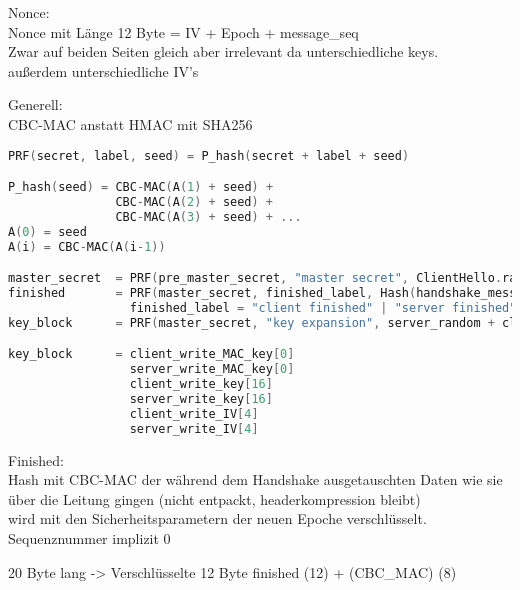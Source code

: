 Nonce:\\
Nonce mit Länge 12 Byte = IV + Epoch + message\_seq\\
Zwar auf beiden Seiten gleich aber irrelevant da unterschiedliche keys.\\
außerdem unterschiedliche IV's

Generell:\\
CBC-MAC anstatt HMAC mit SHA256
\begin{lstlisting}[language=c]
PRF(secret, label, seed) = P_hash(secret + label + seed)

P_hash(seed) = CBC-MAC(A(1) + seed) +
               CBC-MAC(A(2) + seed) +
               CBC-MAC(A(3) + seed) + ...
A(0) = seed
A(i) = CBC-MAC(A(i-1))

master_secret  = PRF(pre_master_secret, "master secret", ClientHello.random + ServerHello.random)[0..47]; (105 | 153) = (36 | 84) + 13 + 28 + 28
finished       = PRF(master_secret, finished_label, Hash(handshake_messages))[0..verify_data_length-1];            79 = 48 + 15 + 16
                 finished_label = "client finished" | "server finished"
key_block      = PRF(master_secret, "key expansion", server_random + client_random);                              117 = 48 + 13 + 28 + 28

key_block      = client_write_MAC_key[0]
                 server_write_MAC_key[0]
                 client_write_key[16]
                 server_write_key[16]
                 client_write_IV[4]
                 server_write_IV[4]
\end{lstlisting}

Finished:\\
Hash mit CBC-MAC der während dem Handshake ausgetauschten Daten wie sie über die Leitung gingen (nicht entpackt, headerkompression bleibt)\\
wird mit den Sicherheitsparametern der neuen Epoche verschlüsselt. Sequenznummer implizit 0

20 Byte lang   ->   Verschlüsselte 12 Byte finished (12) + (CBC\_MAC) (8)